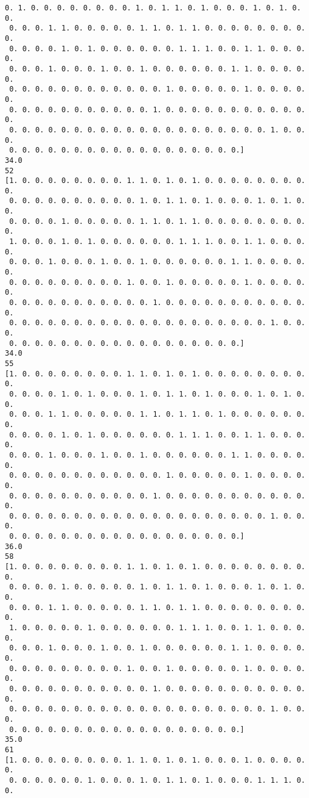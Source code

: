 \documentclass[11pt]{article}
\begin{document}
\begin{Verbatim}[commandchars=\\\{\}]
 0. 1. 0. 0. 0. 0. 0. 0. 0. 0. 1. 0. 1. 1. 0. 1. 0. 0. 0. 1. 0. 1. 0. 0.
 0. 0. 0. 1. 1. 0. 0. 0. 0. 0. 1. 1. 0. 1. 1. 0. 0. 0. 0. 0. 0. 0. 0. 0.
 0. 0. 0. 0. 1. 0. 1. 0. 0. 0. 0. 0. 0. 1. 1. 1. 0. 0. 1. 1. 0. 0. 0. 0.
 0. 0. 0. 1. 0. 0. 0. 1. 0. 0. 1. 0. 0. 0. 0. 0. 0. 1. 1. 0. 0. 0. 0. 0.
 0. 0. 0. 0. 0. 0. 0. 0. 0. 0. 0. 0. 1. 0. 0. 0. 0. 0. 1. 0. 0. 0. 0. 0.
 0. 0. 0. 0. 0. 0. 0. 0. 0. 0. 0. 1. 0. 0. 0. 0. 0. 0. 0. 0. 0. 0. 0. 0.
 0. 0. 0. 0. 0. 0. 0. 0. 0. 0. 0. 0. 0. 0. 0. 0. 0. 0. 0. 0. 1. 0. 0. 0.
 0. 0. 0. 0. 0. 0. 0. 0. 0. 0. 0. 0. 0. 0. 0. 0. 0. 0.]
34.0
52
[1. 0. 0. 0. 0. 0. 0. 0. 0. 1. 1. 0. 1. 0. 1. 0. 0. 0. 0. 0. 0. 0. 0. 0.
 0. 0. 0. 0. 0. 0. 0. 0. 0. 0. 1. 0. 1. 1. 0. 1. 0. 0. 0. 1. 0. 1. 0. 0.
 0. 0. 0. 0. 1. 0. 0. 0. 0. 0. 1. 1. 0. 1. 1. 0. 0. 0. 0. 0. 0. 0. 0. 0.
 1. 0. 0. 0. 1. 0. 1. 0. 0. 0. 0. 0. 0. 1. 1. 1. 0. 0. 1. 1. 0. 0. 0. 0.
 0. 0. 0. 1. 0. 0. 0. 1. 0. 0. 1. 0. 0. 0. 0. 0. 0. 1. 1. 0. 0. 0. 0. 0.
 0. 0. 0. 0. 0. 0. 0. 0. 0. 1. 0. 0. 1. 0. 0. 0. 0. 0. 1. 0. 0. 0. 0. 0.
 0. 0. 0. 0. 0. 0. 0. 0. 0. 0. 0. 1. 0. 0. 0. 0. 0. 0. 0. 0. 0. 0. 0. 0.
 0. 0. 0. 0. 0. 0. 0. 0. 0. 0. 0. 0. 0. 0. 0. 0. 0. 0. 0. 0. 1. 0. 0. 0.
 0. 0. 0. 0. 0. 0. 0. 0. 0. 0. 0. 0. 0. 0. 0. 0. 0. 0.]
34.0
55
[1. 0. 0. 0. 0. 0. 0. 0. 0. 1. 1. 0. 1. 0. 1. 0. 0. 0. 0. 0. 0. 0. 0. 0.
 0. 0. 0. 0. 1. 0. 1. 0. 0. 0. 1. 0. 1. 1. 0. 1. 0. 0. 0. 1. 0. 1. 0. 0.
 0. 0. 0. 1. 1. 0. 0. 0. 0. 0. 1. 1. 0. 1. 1. 0. 1. 0. 0. 0. 0. 0. 0. 0.
 0. 0. 0. 0. 1. 0. 1. 0. 0. 0. 0. 0. 0. 1. 1. 1. 0. 0. 1. 1. 0. 0. 0. 0.
 0. 0. 0. 1. 0. 0. 0. 1. 0. 0. 1. 0. 0. 0. 0. 0. 0. 1. 1. 0. 0. 0. 0. 0.
 0. 0. 0. 0. 0. 0. 0. 0. 0. 0. 0. 0. 1. 0. 0. 0. 0. 0. 1. 0. 0. 0. 0. 0.
 0. 0. 0. 0. 0. 0. 0. 0. 0. 0. 0. 1. 0. 0. 0. 0. 0. 0. 0. 0. 0. 0. 0. 0.
 0. 0. 0. 0. 0. 0. 0. 0. 0. 0. 0. 0. 0. 0. 0. 0. 0. 0. 0. 0. 1. 0. 0. 0.
 0. 0. 0. 0. 0. 0. 0. 0. 0. 0. 0. 0. 0. 0. 0. 0. 0. 0.]
36.0
58
[1. 0. 0. 0. 0. 0. 0. 0. 0. 1. 1. 0. 1. 0. 1. 0. 0. 0. 0. 0. 0. 0. 0. 0.
 0. 0. 0. 0. 1. 0. 0. 0. 0. 0. 1. 0. 1. 1. 0. 1. 0. 0. 0. 1. 0. 1. 0. 0.
 0. 0. 0. 1. 1. 0. 0. 0. 0. 0. 1. 1. 0. 1. 1. 0. 0. 0. 0. 0. 0. 0. 0. 0.
 1. 0. 0. 0. 0. 0. 1. 0. 0. 0. 0. 0. 0. 1. 1. 1. 0. 0. 1. 1. 0. 0. 0. 0.
 0. 0. 0. 1. 0. 0. 0. 1. 0. 0. 1. 0. 0. 0. 0. 0. 0. 1. 1. 0. 0. 0. 0. 0.
 0. 0. 0. 0. 0. 0. 0. 0. 0. 1. 0. 0. 1. 0. 0. 0. 0. 0. 1. 0. 0. 0. 0. 0.
 0. 0. 0. 0. 0. 0. 0. 0. 0. 0. 0. 1. 0. 0. 0. 0. 0. 0. 0. 0. 0. 0. 0. 0.
 0. 0. 0. 0. 0. 0. 0. 0. 0. 0. 0. 0. 0. 0. 0. 0. 0. 0. 0. 0. 1. 0. 0. 0.
 0. 0. 0. 0. 0. 0. 0. 0. 0. 0. 0. 0. 0. 0. 0. 0. 0. 0.]
35.0
61
[1. 0. 0. 0. 0. 0. 0. 0. 0. 1. 1. 0. 1. 0. 1. 0. 0. 0. 1. 0. 0. 0. 0. 0.
 0. 0. 0. 0. 0. 0. 1. 0. 0. 0. 1. 0. 1. 1. 0. 1. 0. 0. 0. 1. 1. 1. 0. 0.

\end{Verbatim}
\end{document}
